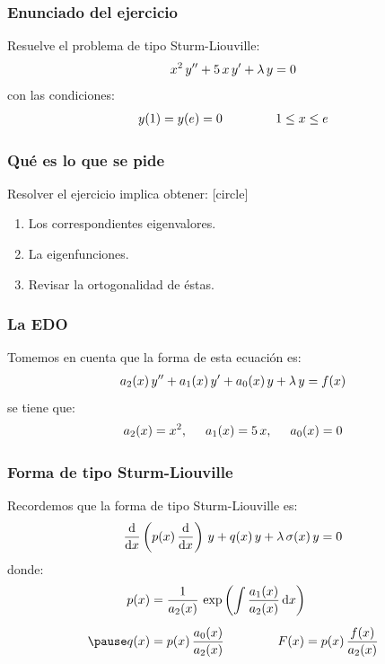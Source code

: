 \documentclass[12pt]{beamer}
\begin{document}
\begin{frame}
\frametitle{Enunciado del ejercicio}
Resuelve el problema de tipo Sturm-Liouville:
\pause
\begin{align*}
x^{2} \, {y}^{\prime \prime} + 5 \, x \, {y}^{\prime} + \lambda \, y = 0
\end{align*}
con las condiciones:
\begin{align*}
y(1) = y(e) = 0 \hspace{1.5cm} 1 \leq x \leq e
\end{align*}
\end{frame}
\begin{frame}
\frametitle{Qué es lo que se pide}
Resolver el ejercicio implica obtener:
[circle]
\begin{enumerate}[<+->]
\item Los correspondientes eigenvalores.
\item La eigenfunciones.
\item Revisar la ortogonalidad de éstas.
\end{enumerate}
\end{frame}
\begin{frame}
\frametitle{La EDO}
Tomemos en cuenta que la forma de esta ecuación es:
\pause
\begin{align*}
a_{2} (x) \, {y}^{\prime \prime} + a_{1} (x) \, {y}^{\prime} + a_{0}(x) \, y + \lambda \, y = f(x)
\end{align*}
\pause
se tiene que:
\begin{align*}
a_{2} (x) = x^{2}, \hspace{0.5cm} a_{1} (x) = 5\, x, \hspace{0.5cm} a_{0} (x) = 0
\end{align*}
\end{frame}
\begin{frame}
\frametitle{Forma de tipo Sturm-Liouville}
Recordemos que la forma de tipo Sturm-Liouville es:
\pause
\begin{align*}
\dv{x} \left( p(x) \, \dv{x} \right) \, y + q(x) \, y + \lambda \, \sigma (x) \, y = 0
\end{align*}
donde:
\begin{eqnarray*}
\begin{aligned}
p (x) &= \dfrac{1}{a_{2} (x)} \, \exp \left( \scaleint{5ex} \, \dfrac{a_{1} (x)}{a_{2} (x)} \dd{x} \right) \\[0.5em] \pause
q (x) &= p (x) \, \dfrac{a_{0} (x)}{a_{2} (x)} \hspace{1.5cm} F (x) = p (x) \, \dfrac{f (x)}{a_{2} (x)}
\end{aligned}
\end{eqnarray*}
\end{frame}
\end{document}

